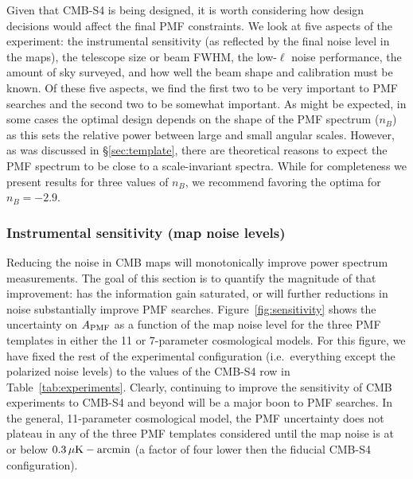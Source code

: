 \documentclass[apj]{emulateapj}
\newcommand{\apmf}{\ensuremath{A_{\rm PMF}}}
\newcommand{\ukarcmin}{\ensuremath{\mu}{\rm K-arcmin}}
\begin{document}
Given that CMB-S4 is being designed, it is worth considering how design decisions would affect the final PMF constraints. 
We look at five aspects of the experiment: the instrumental sensitivity (as reflected by the final noise level in the maps), the telescope size or beam FWHM,  the low-$\ell$ noise performance, the amount of sky surveyed,  and how well the beam shape and calibration must be known. 
Of these five aspects, we find the first two to be very important to PMF searches and the second two to be somewhat important. 
As might be expected, in some cases the optimal design depends on the shape of the PMF spectrum ($n_B$) as this sets  the relative power between large and small angular scales.  
However, as was discussed in \S\ref{sec:template},  there are theoretical reasons to expect the PMF spectrum to be close to a scale-invariant spectra. 
While for completeness we present results for three values of $n_B$, we recommend favoring the optima for $n_B=-2.9$. 

\subsubsection{Instrumental sensitivity (map noise levels)}

Reducing the noise in CMB maps will monotonically improve power spectrum measurements. 
The goal of this section is to quantify the magnitude of that improvement: has the information gain saturated, or will further reductions in noise substantially improve PMF searches. 
Figure~\ref{fig:sensitivity} shows the uncertainty on \apmf{} as a function of the map noise level for the three PMF templates in either the 11 or 7-parameter cosmological models. 
For this figure, we have fixed the rest of the experimental configuration (i.e.~everything except the polarized noise levels) to the values of the CMB-S4 row in Table~\ref{tab:experiments}. 
Clearly, continuing to improve the sensitivity of CMB experiments to CMB-S4 and beyond will be a major boon to PMF searches. 
In the general, 11-parameter cosmological model, the PMF uncertainty does not plateau in any of the three PMF templates considered until the map noise is at or below $0.3\,\ukarcmin$ (a factor of four lower then the fiducial CMB-S4 configuration). 
\end{document}
